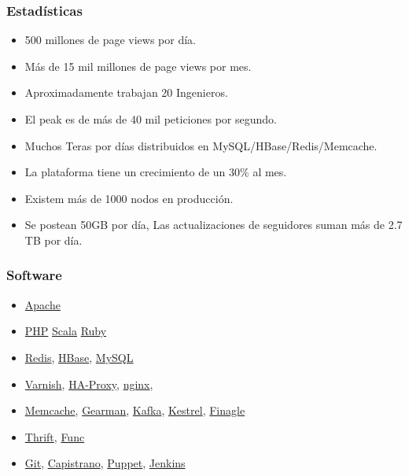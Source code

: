 \documentclass[12pt]{beamer}
\begin{document}
\begin{frame}
 \frametitle{Estadísticas}
 \begin{multicols}{2}
    \begin{itemize}
     \item 500 millones de page views por día.
     \item Más de 15 mil millones de page views por mes.
     \item Aproximadamente trabajan 20 Ingenieros.
     \item El peak es de más de 40 mil peticiones por segundo.
     \item Muchos Teras por días distribuidos en  MySQL/HBase/Redis/Memcache.
     \item La plataforma tiene un crecimiento de un 30\% al mes.
     \item Existem más de 1000 nodos en producción.
     \item Se postean 50GB por día, Las actualizaciones de seguidores suman más de 2.7 TB por día.
    \end{itemize}
  \end{multicols}
\end{frame}


\begin{frame}
 \frametitle{Software}
 \begin{multicols}{2}
    \begin{itemize}
     \item \href{http://www.apache.org/}{Apache}
     \item \href{http://php.net/}{PHP} \href{http://www.scala-lang.org/}{Scala} \href{http://www.ruby-lang.org/es/}{Ruby}
     \item \href{http://redis.io/}{Redis}, \href{http://hbase.apache.org/}{HBase}, \href{http://www.mysql.com/}{MySQL}
     \item \href{https://www.varnish-cache.org/}{Varnish}, \href{http://haproxy.1wt.eu/}{HA-Proxy}, \href{http://nginx.org/}{nginx}, 
     \item \href{http://memcached.org/}{Memcache}, \href{http://www.gearman.org/}{Gearman}, \href{http://kafka.apache.org/}{Kafka}, \href{https://github.com/robey/kestrel}{Kestrel}, \href{http://twitter.github.io/finagle/}{Finagle}
     \item \href{http://thrift.apache.org/}{Thrift}, \href{http://func.et.redhat.com/}{Func}
     \item \href{http://git-scm.com/}{Git}, \href{https://github.com/capistrano/capistrano}{Capistrano}, \href{http://www.puppetlabs.com/}{Puppet}, \href{http://jenkins-ci.org/}{Jenkins}
    \end{itemize}
  \end{multicols}
\end{frame}
\end{document}

